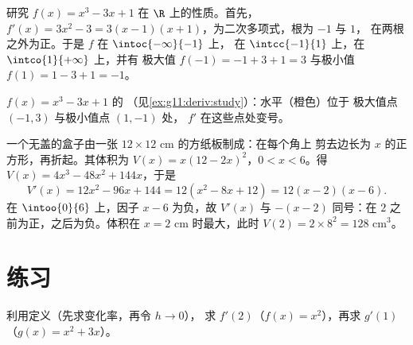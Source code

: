 \begin{example}\label{ex:g11:deriv:study}
研究 $f(x) = x^3 - 3x + 1$ 在 $\R$ 上的性质。首先，
$f'(x) = 3x^2 - 3 = 3(x-1)(x+1)$，为二次多项式，根为 $-1$ 与 $1$，
在两根之外为正。于是 $f$ 在 $\intoc{-\infty}{-1}$ 上，
在 $\intcc{-1}{1}$ 上，在 $\intco{1}{+\infty}$ 上，并有
极大值 $f(-1) = -1 + 3 + 1 = 3$ 与极小值
$f(1) = 1 - 3 + 1 = -1$。
\end{example}

\begin{omfigure}

{\small {} $f(x) = x^3 - 3x + 1$ 的
（见\cref{ex:g11:deriv:study}）：水平（橙色）位于
极大值点 $(-1, 3)$ 与极小值点 $(1, -1)$ 处，
$f'$ 在这些点处变号。}
\end{omfigure}

\begin{example}[优化问题]\label{ex:g11:deriv:box}
一个无盖的盒子由一张 $12 \times 12$ cm 的方纸板制成：在每个角上
剪去边长为 $x$ 的正方形，再折起。其体积为
$V(x) = x(12 - 2x)^2$，$0 < x < 6$。得
$V(x) = 4x^3 - 48x^2 + 144x$，于是
\[
V'(x) = 12x^2 - 96x + 144 = 12(x^2 - 8x + 12) = 12(x - 2)(x - 6).
\]
在 $\intoo{0}{6}$ 上，因子 $x - 6$ 为负，故 $V'(x)$ 与
$-(x-2)$ 同号：在 $2$ 之前为正，之后为负。体积在
$x = 2$ cm 时最大，此时 $V(2) = 2 \times 8^2 = 128$ cm$^3$。
\end{example}

\section{练习}

\begin{exercise}[$\star$]\label{exo:g11:deriv:1}
利用定义（先求变化率，再令 $h \to 0$），
求 $f'(2)$（$f(x) = x^2$），再求 $g'(1)$（$g(x) = x^2 + 3x$）。
\end{exercise}

